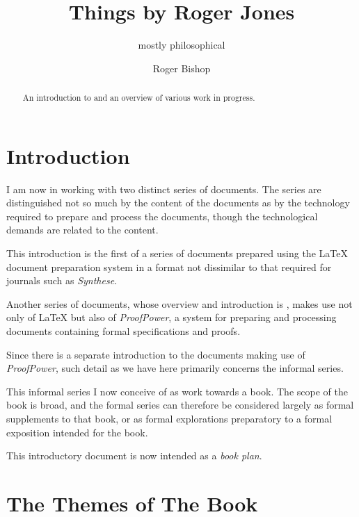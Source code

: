 \documentclass[numreferences]{rbjk}
\begin{document}
                                                                                   
\begin{article}
\begin{opening}  
\title{Things by Roger Jones}
\subtitle{mostly philosophical}
\author{Roger Bishop }

\begin{abstract}
An introduction to and an overview of various work in progress.
\end{abstract}
\end{opening}

\section{Introduction}

I am now in working with two distinct series of documents.
The series are distinguished not so much by the content of the documents as by the technology required to prepare and process the documents, though the technological demands are related to the content.

This introduction is the first of a series of documents prepared using the {\LaTeX} document preparation system in a format not dissimilar to that required for journals such as {\it Synthese}.

Another series of documents, whose overview and introduction is \cite{rbjt000}, makes use not only of {\LaTeX} but also of {\it ProofPower}, a system for preparing and processing documents containing formal specifications and proofs.

Since there is a separate introduction \cite{rbjt000} to the documents making use of {\it ProofPower}, such detail as we have here primarily concerns the informal series.

This informal series I now conceive of as work towards a book.
The scope of the book is broad, and the formal series can therefore be considered largely as formal supplements to that book, or as formal explorations preparatory to a formal exposition intended for the book.

This introductory document is now intended as a {\it book plan}.

\section{The Themes of The Book}


\end{article}
\end{document}
